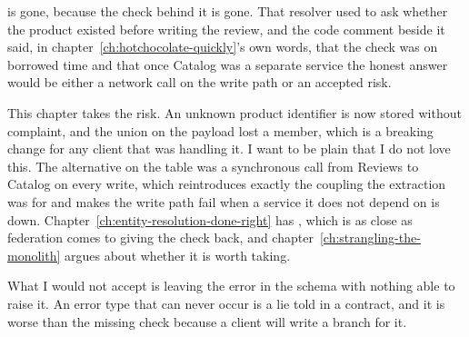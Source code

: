  is gone, because the check behind it is gone. That
resolver used to ask  whether the product existed before
writing the review, and the code comment beside it said, in
chapter~\ref{ch:hotchocolate-quickly}'s own words, that the check was on
borrowed time and that once Catalog was a separate service the honest answer
would be either a network call on the write path or an accepted risk.

This chapter takes the risk. An unknown product identifier is now stored without
complaint, and the union on the payload lost a member, which is a breaking
change for any client that was handling it. I want to be plain that I do not
love this. The alternative on the table was a synchronous call from Reviews to
Catalog on every write, which reintroduces exactly the coupling the extraction
was for and makes the write path fail when a service it does not depend on is
down. Chapter~\ref{ch:entity-resolution-done-right} has , which
is as close as federation comes to giving the check back, and
chapter~\ref{ch:strangling-the-monolith} argues about whether it is worth
taking.

What I would not accept is leaving the error in the schema with nothing able to
raise it. An error type that can never occur is a lie told in a contract, and it
is worse than the missing check because a client will write a branch for it.

%
